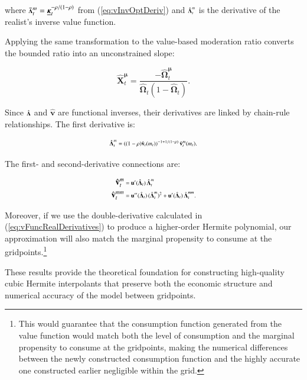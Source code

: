 \documentclass[twocolumn, switch]{article}
\newcommand{\CRRA}{\rho}
\newcommand{\uFunc}{\mathbf{u}}
\newcommand{\mNrm}{m}
\newcommand{\vFunc}{\mathbf{v}}
\newcommand{\uPrime}{\uFunc'}
\newcommand{\MPC}{\boldsymbol{\kappa}}
\newcommand{\MPCmin}{\underline{\MPC}}
\newcommand{\logmNrmEx}{\boldsymbol{\mu}}
\newcommand{\vInv}{{\scriptsize \boldsymbol{\Lambda}}}
\newcommand{\vInvOpt}{\bar{\vInv}}
\newcommand{\vFuncReal}{\hat{\vFunc}}
\newcommand{\vInvReal}{\hat{\vInv}}
\newcommand{\valModRte}{\boldsymbol{\Omega}}
\newcommand{\valModRteReal}{\hat{\valModRte}}
\newcommand{\logitValModRte}{\boldsymbol{X}}
\newcommand{\logitValModRteReal}{\hat{\logitValModRte}}
\newcommand{\vInvOptDeriv}{\vInvOpt^{\mNrm}}
\newcommand{\vInvRealDeriv}{\vInvReal^{\mNrm}}
\newcommand{\valModRteRealDerivmu}{\valModRteReal^{\logmNrmEx}}
\newcommand{\logitValModRteRealDerivmu}{\logitValModRteReal^{\logmNrmEx}}
\newcommand{\vFuncRealDeriv}{\vFuncReal^{\mNrm}}
\newcommand{\uDoublePrime}{\uFunc''}
\newcommand{\vFuncRealDerivSecond}{\vFuncReal^{\mNrm\mNrm}}
\newcommand{\vInvRealDerivSecond}{\vInvReal^{\mNrm\mNrm}}
\begin{document}
where $\vInvOptDeriv_{t} = \MPCmin_{t}^{ -\CRRA/(1 -\CRRA)}$ from (\ref{eq:vInvOptDeriv}) and $\vInvRealDeriv_{t}$ is the derivative of the realist's inverse value function.

Applying the same transformation to the value-based moderation ratio converts the bounded ratio into an unconstrained slope:

\begin{equation}
\label{eq:logitValModRteRealDerivmu}
\logitValModRteRealDerivmu_{t} = \frac{-\valModRteRealDerivmu_{t}}{\valModRteReal_{t}(1-\valModRteReal_{t})}.
\end{equation}

Since $\vInvReal$ and $\vFuncReal$ are functional inverses, their derivatives are linked by chain-rule relationships. The first derivative is:

\begin{equation}
\label{eq:vInvRealDeriv}
\vInvRealDeriv_{t} = \left( (1-\CRRA) \vFuncReal_{t}(\mNrm_{t})\right)^{-1+1/(1-\CRRA)}  \vFuncRealDeriv_{t}(\mNrm_{t}).
\end{equation}

The first- and second-derivative connections are:

\begin{equation}
\label{eq:vFuncRealDerivatives}
\begin{aligned}
\vFuncRealDeriv_{t} &= \uPrime(\vInvReal_{t}) \, \vInvRealDeriv_{t} \\
\vFuncRealDerivSecond_{t} &= \uDoublePrime(\vInvReal_{t}) \, (\vInvRealDeriv_{t})^2 + \uPrime(\vInvReal_{t}) \, \vInvRealDerivSecond_{t}.
\end{aligned}
\end{equation}

Moreover, if we use the double-derivative calculated in (\ref{eq:vFuncRealDerivatives}) to produce a higher-order Hermite polynomial, our approximation will also match the marginal propensity to consume at the gridpoints.\footnote{This would guarantee that the consumption function generated from the value function would match both the level of consumption and the marginal propensity to consume at the gridpoints, making the numerical differences between the newly constructed consumption function and the highly accurate one constructed earlier negligible within the grid.}

These results provide the theoretical foundation for constructing high-quality cubic Hermite interpolants that preserve both the economic structure and numerical accuracy of the model between gridpoints.
\end{document}
